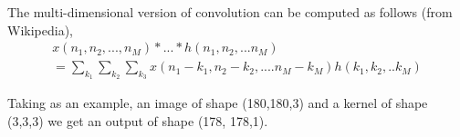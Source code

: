 \documentclass{../template/texnote}
\begin{document}
The multi-dimensional version of convolution can be computed as follows (from Wikipedia),
\begin{align*}
	x(n_1, n_2, ..., n_M) \ast ... \ast h(n_1, n_2, ...n_M) \\
	= \sum_{k_1} \sum_{k_2} \sum_{k_3} x(n_1 - k_1, n_2 - k_2, ....n_M - k_M) h(k_1, k_2,..k_M)
\end{align*}

Taking as an example, an image of shape (180,180,3) and a kernel of shape (3,3,3) we get an output of shape (178, 178,1).

    \printbibliography
\end{document}
